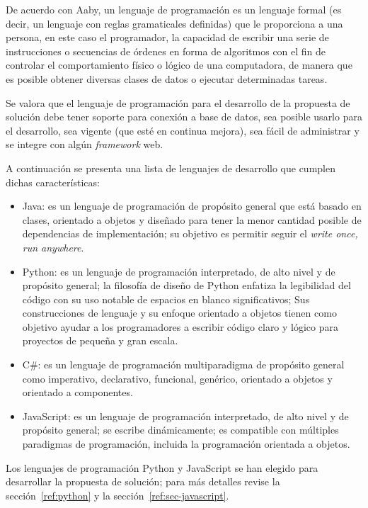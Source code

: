 De acuerdo con Aaby\cite{aaby_introduction_1996}, un lenguaje de programación es un lenguaje formal (es decir, un lenguaje con reglas gramaticales definidas) que le proporciona a una persona, en este caso el programador, la capacidad de escribir una serie de instrucciones o secuencias de órdenes en forma de algoritmos con el fin de controlar el comportamiento físico o lógico de una computadora, de manera que es posible obtener diversas clases de datos o ejecutar determinadas tareas.


Se valora que el lenguaje de programación para el desarrollo de la propuesta de solución debe tener soporte para conexión a base de datos, sea posible usarlo para el desarrollo, sea vigente (que esté en continua mejora), sea fácil de administrar y se integre con algún \textit{framework} web.


A continuación se presenta una lista de lenguajes de desarrollo que cumplen dichas características:

\begin{itemize}
    \item Java: es un lenguaje de programación de propósito general que está basado en clases, orientado a objetos y diseñado para tener la menor cantidad posible de dependencias de implementación; su objetivo es permitir seguir el  \textit{write once, run anywhere}\cite{joy_java_2000}.
    \item Python: es un lenguaje de programación interpretado, de alto nivel y de propósito general; la filosofía de diseño de Python enfatiza la legibilidad del código con su uso notable de espacios en blanco significativos; Sus construcciones de lenguaje y su enfoque orientado a objetos tienen como objetivo ayudar a los programadores a escribir código claro y lógico para proyectos de pequeña y gran escala\cite{van_rossum_python_2007}.
    \item C\#: es un lenguaje de programación multiparadigma de propósito general como imperativo, declarativo, funcional, genérico, orientado a objetos y orientado a componentes\cite{hejlsberg_c_2003}.
    \item JavaScript: es un lenguaje de programación interpretado, de alto nivel y de propósito general; se escribe dinámicamente; es compatible con múltiples paradigmas de programación, incluida la programación orientada a objetos\cite{noauthor_javascript_nodate}.
\end{itemize}

Los lenguajes de programación Python y JavaScript se han elegido para desarrollar la propuesta de solución; para más detalles revise la sección~\ref{ref:python} y la sección~\ref{ref:sec-javascript}.

